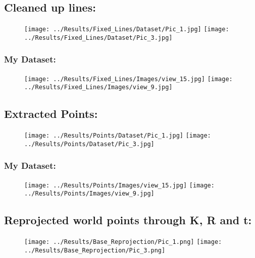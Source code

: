 \documentclass{article}
\begin{document}
\subsection{Cleaned up lines:}
\begin{figure}[H]
    \centering
    \texttt{[image: ../Results/Fixed\_Lines/Dataset/Pic\_1.jpg]}
    \texttt{[image: ../Results/Fixed\_Lines/Dataset/Pic\_3.jpg]}
\end{figure}

\subsubsection*{My Dataset:}
\begin{figure}[H]
    \centering
    \texttt{[image: ../Results/Fixed\_Lines/Images/view\_15.jpg]}
    \texttt{[image: ../Results/Fixed\_Lines/Images/view\_9.jpg]}
\end{figure}


\subsection{Extracted Points:}
\begin{figure}[H]
    \centering
    \texttt{[image: ../Results/Points/Dataset/Pic\_1.jpg]}
    \texttt{[image: ../Results/Points/Dataset/Pic\_3.jpg]}
\end{figure}

\subsubsection*{My Dataset:}
\begin{figure}[H]
    \centering
    \texttt{[image: ../Results/Points/Images/view\_15.jpg]}
    \texttt{[image: ../Results/Points/Images/view\_9.jpg]}
\end{figure}


\subsection{Reprojected world points through K, R and t:}
\begin{figure}[H]
    \centering
    \texttt{[image: ../Results/Base\_Reprojection/Pic\_1.png]}
    \texttt{[image: ../Results/Base\_Reprojection/Pic\_3.png]}
\end{figure}
\end{document}
